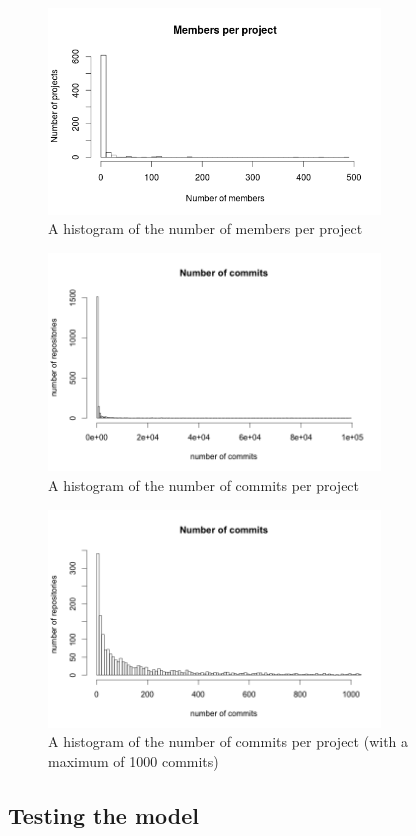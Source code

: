	    \begin{figure}
	        \includegraphics[width=250pt]{figures/number-of-members-per-project}
	        \caption{A histogram of the number of members per project}
	        \label{fig:number-of-members-per-project-plot}
	    \end{figure}
	    \begin{figure}
	        \includegraphics[width=250pt]{figures/number-of-commits-all}
	        \caption{A histogram of the number of commits per project}
	        \label{fig:number-of-commits-all-plot}
	    \end{figure}
	    \begin{figure}
	        \includegraphics[width=250pt]{figures/number-of-commits-1000}
	        \caption{A histogram of the number of commits per project (with a maximum of 1000 commits)}
	        \label{fig:number-of-commits-1000-plot}

	    \end{figure}
    
    \subsection{Testing the model}
